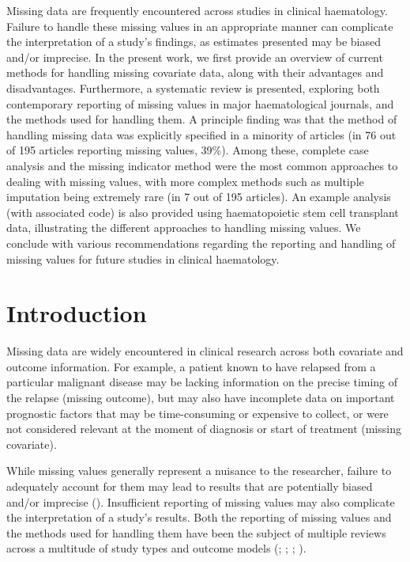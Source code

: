 \documentclass[
  letterpaper,
  DIV=11,
  numbers=noendperiod]{scrreprt}
\begin{document}
Missing data are frequently encountered across studies in clinical
haematology. Failure to handle these missing values in an appropriate
manner can complicate the interpretation of a study's findings, as
estimates presented may be biased and/or imprecise. In the present work,
we first provide an overview of current methods for handling missing
covariate data, along with their advantages and disadvantages.
Furthermore, a systematic review is presented, exploring both
contemporary reporting of missing values in major haematological
journals, and the methods used for handling them. A principle finding
was that the method of handling missing data was explicitly specified in
a minority of articles (in 76 out of 195 articles reporting missing
values, 39\%). Among these, complete case analysis and the missing
indicator method were the most common approaches to dealing with missing
values, with more complex methods such as multiple imputation being
extremely rare (in 7 out of 195 articles). An example analysis (with
associated code) is also provided using haematopoietic stem cell
transplant data, illustrating the different approaches to handling
missing values. We conclude with various recommendations regarding the
reporting and handling of missing values for future studies in clinical
haematology.

\hfill\break

\section{Introduction}\label{introduction}

Missing data are widely encountered in clinical research across both
covariate and outcome information. For example, a patient known to have
relapsed from a particular malignant disease may be lacking information
on the precise timing of the relapse (missing outcome), but may also
have incomplete data on important prognostic factors that may be
time-consuming or expensive to collect, or were not considered relevant
at the moment of diagnosis or start of treatment (missing covariate).

While missing values generally represent a nuisance to the researcher,
failure to adequately account for them may lead to results that are
potentially biased and/or imprecise
(). Insufficient reporting of missing values may also
complicate the interpretation of a study's results. Both the reporting
of missing values and the methods used for handling them have been the
subject of multiple reviews across a multitude of study types and
outcome models (; ; ; ).
\end{document}
